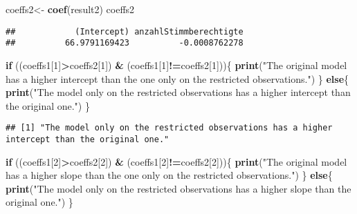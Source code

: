 \documentclass[
]{book}
\newenvironment{Shaded}{\begin{snugshade}}{\end{snugshade}}
\newcommand{\ControlFlowTok}[1]{\textcolor[rgb]{0.13,0.29,0.53}{\textbf{#1}}}
\newcommand{\DecValTok}[1]{\textcolor[rgb]{0.00,0.00,0.81}{#1}}
\newcommand{\FunctionTok}[1]{\textcolor[rgb]{0.13,0.29,0.53}{\textbf{#1}}}
\newcommand{\NormalTok}[1]{#1}
\newcommand{\OtherTok}[1]{\textcolor[rgb]{0.56,0.35,0.01}{#1}}
\newcommand{\SpecialCharTok}[1]{\textcolor[rgb]{0.81,0.36,0.00}{\textbf{#1}}}
\newcommand{\StringTok}[1]{\textcolor[rgb]{0.31,0.60,0.02}{#1}}
\begin{document}
\begin{Shaded}
\begin{Highlighting}[]
\NormalTok{coeffs2}\OtherTok{\textless{}{-}} \FunctionTok{coef}\NormalTok{(result2)}
\NormalTok{coeffs2}
\end{Highlighting}
\end{Shaded}

\begin{verbatim}
##            (Intercept) anzahlStimmberechtigte 
##          66.9791169423          -0.0008762278
\end{verbatim}

\begin{Shaded}
\begin{Highlighting}[]
\ControlFlowTok{if}\NormalTok{ ((coeffs1[}\DecValTok{1}\NormalTok{]}\SpecialCharTok{\textgreater{}}\NormalTok{coeffs2[}\DecValTok{1}\NormalTok{]) }\SpecialCharTok{\&}\NormalTok{ (coeffs1[}\DecValTok{1}\NormalTok{]}\SpecialCharTok{!=}\NormalTok{coeffs2[}\DecValTok{1}\NormalTok{]))\{}
  \FunctionTok{print}\NormalTok{(}\StringTok{"The original model has a higher intercept than the one only on the restricted observations."}\NormalTok{)}
\NormalTok{\} }\ControlFlowTok{else}\NormalTok{\{}
  \FunctionTok{print}\NormalTok{(}\StringTok{"The model only on the restricted observations has a higher intercept than the original one."}\NormalTok{)}
\NormalTok{\}}
\end{Highlighting}
\end{Shaded}

\begin{verbatim}
## [1] "The model only on the restricted observations has a higher intercept than the original one."
\end{verbatim}

\begin{Shaded}
\begin{Highlighting}[]
\ControlFlowTok{if}\NormalTok{ ((coeffs1[}\DecValTok{2}\NormalTok{]}\SpecialCharTok{\textgreater{}}\NormalTok{coeffs2[}\DecValTok{2}\NormalTok{]) }\SpecialCharTok{\&}\NormalTok{ (coeffs1[}\DecValTok{2}\NormalTok{]}\SpecialCharTok{!=}\NormalTok{coeffs2[}\DecValTok{2}\NormalTok{]))\{}
  \FunctionTok{print}\NormalTok{(}\StringTok{"The original model has a higher slope than the one only on the restricted observations."}\NormalTok{)}
\NormalTok{\} }\ControlFlowTok{else}\NormalTok{\{}
  \FunctionTok{print}\NormalTok{(}\StringTok{"The model only on the restricted observations has a higher slope than the original one."}\NormalTok{)}
\NormalTok{\}}
\end{Highlighting}
\end{Shaded}
\end{document}
